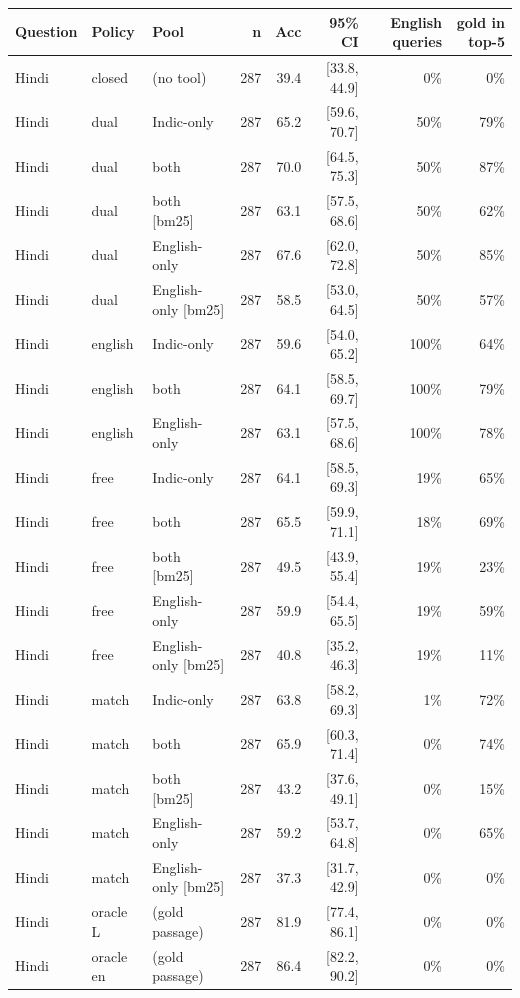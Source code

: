 \begin{table}[htbp]\centering\scriptsize
\begin{tabular}{lllrrrrr}
\toprule
Question & Policy & Pool & n & Acc & 95\% CI & English queries & gold in top-5 \\
\midrule
Hindi & closed & (no tool) & 287 & 39.4 & [33.8, 44.9] & 0\% & 0\% \\
Hindi & dual & Indic-only & 287 & 65.2 & [59.6, 70.7] & 50\% & 79\% \\
Hindi & dual & both & 287 & 70.0 & [64.5, 75.3] & 50\% & 87\% \\
Hindi & dual & both [bm25] & 287 & 63.1 & [57.5, 68.6] & 50\% & 62\% \\
Hindi & dual & English-only & 287 & 67.6 & [62.0, 72.8] & 50\% & 85\% \\
Hindi & dual & English-only [bm25] & 287 & 58.5 & [53.0, 64.5] & 50\% & 57\% \\
Hindi & english & Indic-only & 287 & 59.6 & [54.0, 65.2] & 100\% & 64\% \\
Hindi & english & both & 287 & 64.1 & [58.5, 69.7] & 100\% & 79\% \\
Hindi & english & English-only & 287 & 63.1 & [57.5, 68.6] & 100\% & 78\% \\
Hindi & free & Indic-only & 287 & 64.1 & [58.5, 69.3] & 19\% & 65\% \\
Hindi & free & both & 287 & 65.5 & [59.9, 71.1] & 18\% & 69\% \\
Hindi & free & both [bm25] & 287 & 49.5 & [43.9, 55.4] & 19\% & 23\% \\
Hindi & free & English-only & 287 & 59.9 & [54.4, 65.5] & 19\% & 59\% \\
Hindi & free & English-only [bm25] & 287 & 40.8 & [35.2, 46.3] & 19\% & 11\% \\
Hindi & match & Indic-only & 287 & 63.8 & [58.2, 69.3] & 1\% & 72\% \\
Hindi & match & both & 287 & 65.9 & [60.3, 71.4] & 0\% & 74\% \\
Hindi & match & both [bm25] & 287 & 43.2 & [37.6, 49.1] & 0\% & 15\% \\
Hindi & match & English-only & 287 & 59.2 & [53.7, 64.8] & 0\% & 65\% \\
Hindi & match & English-only [bm25] & 287 & 37.3 & [31.7, 42.9] & 0\% & 0\% \\
Hindi & oracle L & (gold passage) & 287 & 81.9 & [77.4, 86.1] & 0\% & 0\% \\
Hindi & oracle en & (gold passage) & 287 & 86.4 & [82.2, 90.2] & 0\% & 0\% \\

\end{tabular}
\end{table}
